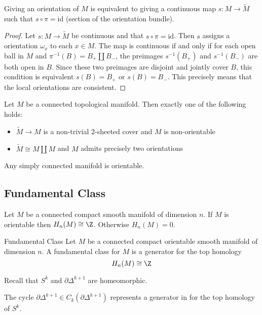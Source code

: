 \documentclass[a4paper]{article}
\begin{document}
\begin{lmm}{}{} Giving an orientation of $M$ is equivalent to giving a continuous map $s:M\to\widetilde{M}$ such that $s\circ\pi=\text{id}$ (section of the orientation bundle). \tcbline
\begin{proof}
Let $s:M\to\widetilde{M}$ be continuous and that $s\circ\pi=\text{id}$. Then $s$ assigns a orientation $\omega_x$ to each $x\in M$. The map is continuous if and only if for each open ball in $M$ and $\pi^{-1}(B)=B_+\amalg B_-$, the preimages $s^{-1}(B_+)$ and $s^{-1}(B_-)$ are both open in $B$. Since these two preimages are disjoint and jointly cover $B$, this condition is equivalent $s(B)=B_+$ or $s(B)=B_-$. This precisely means that the local orientations are consistent. 
\end{proof}
\end{lmm}

\begin{crl}{}{} Let $M$ be a connected topological manifold. Then exactly one of the following holds: 
\begin{itemize}
\item $\widetilde{M}\to M$ is a non-trivial $2$-sheeted cover and $M$ is non-orientable
\item $\widetilde{M}\cong M\amalg M$ and $M$ admits precisely two orientations
\end{itemize}
\end{crl}

\begin{crl}{}{} Any simply connected manifold is orientable. 
\end{crl}

\subsection{Fundamental Class}
\begin{prp}{}{} Let $M$ be a connected compact smooth manifold of dimension $n$. If $M$ is orientable then $H_n(M)\cong\Z$. Otherwise $H_n(M)=0$. 
\end{prp}

\begin{defn}{Fundamental Class}{} Let $M$ be a connected compact orientable smooth manifold of dimension $n$. A fundamental class for $M$ is a generator for the top homology $$H_n(M)\cong\Z$$
\end{defn}

Recall that $S^k$ and $\partial\Delta^{k+1}$ are homeomorphic. 

\begin{prp}{}{} The cycle $\partial\Delta^{k+1}\in C_k(\partial\Delta^{k+1})$ represents a generator in for the top homology of $S^k$. 
\end{prp}
\end{document}
